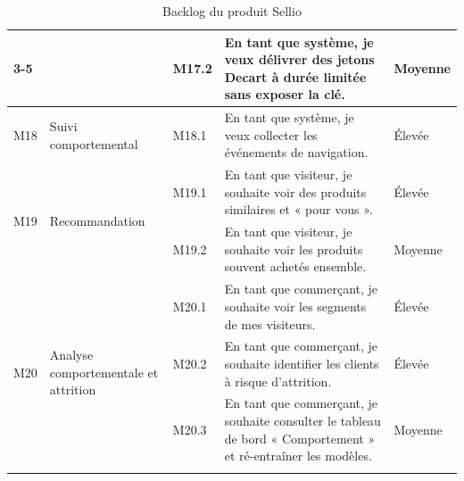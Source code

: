 \begin{longtable}{|p{0.9cm}|p{3cm}|p{1.3cm}|p{6.6cm}|p{1.9cm}|}
\cline{3-5}
 & & M17.2 & En tant que système, je veux délivrer des jetons Decart à durée limitée sans exposer la clé. & Moyenne \\
\hline
M18 & Suivi comportemental & M18.1 & En tant que système, je veux collecter les événements de navigation. & Élevée \\
\hline
\multirow{2}{*}{M19} & \multirow{2}{3cm}{Recommandation} & M19.1 & En tant que visiteur, je souhaite voir des produits similaires et « pour vous ». & Élevée \\
\cline{3-5}
 & & M19.2 & En tant que visiteur, je souhaite voir les produits souvent achetés ensemble. & Moyenne \\
\hline
\multirow{3}{*}{M20} & \multirow{3}{3cm}{Analyse comportementale et attrition} & M20.1 & En tant que commerçant, je souhaite voir les segments de mes visiteurs. & Élevée \\
\cline{3-5}
 & & M20.2 & En tant que commerçant, je souhaite identifier les clients à risque d'attrition. & Élevée \\
\cline{3-5}
 & & M20.3 & En tant que commerçant, je souhaite consulter le tableau de bord « Comportement » et ré-entraîner les modèles. & Moyenne \\
\hline
\caption{Backlog du produit Sellio}
\label{tab:backlog-produit}
\end{longtable}
\normalsize

